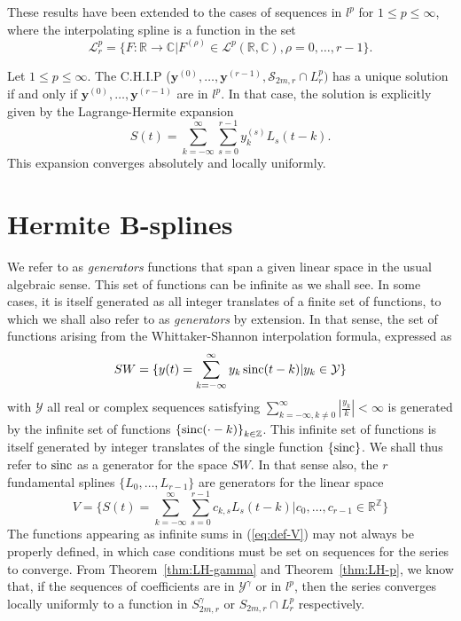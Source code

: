 These results have been extended to the cases of sequences in $l^p$ for $1 \leq p \leq \infty$, where the interpolating 
spline is a function in the set 
\begin{equation*}
  \mathcal{L}^p_r = \{F:\mathbb{R} \to \mathbb{C}| F^{(\rho)} \in \mathcal{L}^p(\mathbb{R}, \mathbb{C}), \rho=0, \ldots, 
  r-1\}.
\end{equation*}

\begin{thm}\label{thm:LH-p} Let $1 \leq p \leq \infty$. The C.H.I.P 
  ($\bm{y}^{(0)}, \ldots, \bm{y}^{(r-1)}, \mathscr{S}_{2m,r}\cap L^p_r)$ has a unique solution if and only if 
  $\bm{y}^{(0)}, \ldots, \bm{y}^{(r-1)}$ are in  $l^p$. In that case, the solution is explicitly given by the 
  Lagrange-Hermite expansion
  \begin{equation}
    S(t) = \sum_{k=-\infty}^{\infty} \sum_{s=0}^{r-1} y_k^{(s)} L_s(t-k).
  \end{equation}
  This expansion converges absolutely and locally uniformly.
\end{thm}

\section{Hermite B-splines}

We refer to as \emph{generators} functions that span a given linear space in the usual algebraic sense.  This set of 
functions can be infinite as we shall see. In some cases, it is itself generated as all integer translates of a finite 
set of functions, to which we shall also refer to as \emph{generators} by extension. In that sense, the set of functions 
arising from the Whittaker-Shannon interpolation formula, expressed as
\begin{equation*}
  SW = \{y(t) = \sum_{k=-\infty}^{\infty} y_k \operatorname*{sinc}(t-k) | y_k \in \mathcal{Y}\}
\end{equation*}
with $\mathcal{Y}$ all real or complex sequences satisfying $\displaystyle\sum_{k=-\infty, k\neq0}^{\infty} 
|\frac{y_k}{k}|<\infty$ is generated by the infinite set of functions ${\{\operatorname*{sinc}(\cdot-k)\}}_{k \in \mathbb{Z}}$. This 
infinite set of functions is itself generated by integer translates of the single function $\{\operatorname*{sinc}\}$. We shall thus 
refer to $\operatorname*{sinc}$ as a generator for the space $SW$. In that sense also, the $r$ fundamental splines $\{L_0, \ldots, 
L_{r-1}\}$ are generators for the linear space
\begin{equation}\label{eq:def-V}
  V = \{S(t) = \sum_{k=-\infty}^{\infty} \sum_{s=0}^{r-1} c_{k,s} L_s(t-k) | c_0, \ldots, c_{r-1} \in 
\mathbb{R}^{\mathbb{Z}}\}
\end{equation}
The functions appearing as infinite sums in (\ref{eq:def-V}) may not always be properly defined, in which case
conditions must be set on sequences for the series to converge. From Theorem~\ref{thm:LH-gamma} and 
Theorem~\ref{thm:LH-p}, we know that, if the sequences of coefficients are in $\mathcal{Y}^{\gamma}$ or in $l^p$, then 
the series converges locally uniformly to a function in $S_{2m, r}^{\gamma}$ or $S_{2m, r}\cap L^p_r$ respectively. \\

